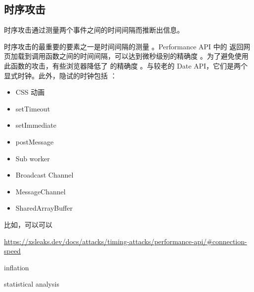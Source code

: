 \subsection{时序攻击}

时序攻击通过测量两个事件之间的时间间隔而推断出信息。

时序攻击的最重要的要素之一是时间间隔的测量 \cite{clock}。Performance API 中的  返回网页加载到调用函数之间的时间间隔，可以达到微秒级别的精确度 \cite{m_now}。为了避免使用此函数的攻击，有些浏览器降低了 的精确度 \cite{p_chr,p_moz,p_web}。与较老的 Date API，它们是两个显式时钟。此外，隐试的时钟包括 \cite{timers}：

\begin{itemize}
    \item CSS 动画
    \item setTimeout
    \item setImmediate
    \item postMessage
    \item Sub worker
    \item Broadcast Channel
    \item MessageChannel
    \item SharedArrayBuffer
\end{itemize}

比如，可以可以

\url{https://xsleaks.dev/docs/attacks/timing-attacks/performance-api/#connection-speed}

inflation

statistical analysis
